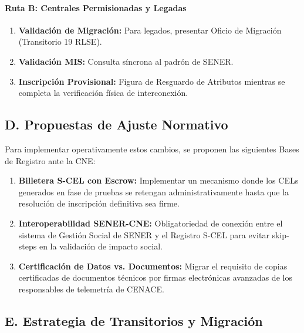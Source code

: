 \documentclass{cel}
\begin{document}
\paragraph{Ruta B: Centrales Permisionadas y Legadas}
\nopagebreak

\begin{enumerate}
\item \textbf{Validación de Migración:} Para legados, presentar Oficio de Migración (Transitorio 19 RLSE).
\item \textbf{Validación MIS:} Consulta síncrona al padrón de SENER.
\item \textbf{Inscripción Provisional:} Figura de \textquotedbl{}Resguardo de Atributos\textquotedbl{} mientras se completa la verificación física de interconexión.


\end{enumerate}
\subsection{D. Propuestas de Ajuste Normativo}
\nopagebreak

Para implementar operativamente estos cambios, se proponen las siguientes Bases de Registro ante la CNE:


\begin{enumerate}
\item \textbf{Billetera S-CEL con \textquotedbl{}Escrow\textquotedbl{}:} Implementar un mecanismo donde los CELs generados en fase de pruebas se retengan administrativamente hasta que la resolución de inscripción definitiva sea firme.
\item \textbf{Interoperabilidad SENER-CNE:} Obligatoriedad de conexión entre el sistema de Gestión Social de SENER y el Registro S-CEL para evitar \textquotedbl{}skip-steps\textquotedbl{} en la validación de impacto social.
\item \textbf{Certificación de Datos vs. Documentos:} Migrar el requisito de \textquotedbl{}copias certificadas\textquotedbl{} de documentos técnicos por \textquotedbl{}firmas electrónicas avanzadas\textquotedbl{} de los responsables de telemetría de CENACE.


\end{enumerate}
\vspace{0.4cm}
\subsection{E. Estrategia de Transitorios y Migración}
\nopagebreak
\end{document}
